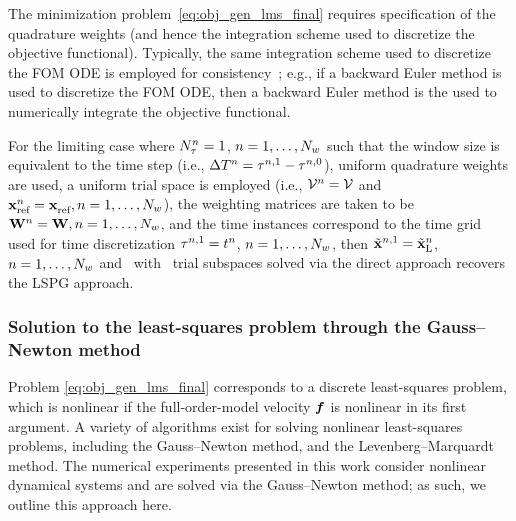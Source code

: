 The minimization problem~\eqref{eq:obj_gen_lms_final} requires specification of the quadrature weights (and hence the integration scheme used to discretize 
the objective functional). Typically, the same integration scheme used to discretize the FOM ODE is employed for consistency~\cite{colloc_review}; e.g., if a  
backward Euler method is used to discretize the FOM ODE, then a backward Euler method is the used to numerically integrate the objective functional.

\begin{remark}
For the limiting case where $N_{\tau}^{n} = 1$, $n=1,\ldots,N_w$ such that the window size is equivalent to the time step (i.e., $\Delta T^{n} = \tau^{n,1} - \tau^{n,0}$), uniform 
quadrature weights are used, a uniform trial space is employed (i.e., $\mathcal{V }^{n} = \mathcal{V }$ and $\mathbf{x}_\text{ref}^{n} = \mathbf{x}_\text{ref}^{}, n=1,\ldots,N_w$), the weighting matrices are taken to be
$\mathbf{W}^{n} = \mathbf{W}, n=1,\ldots,N_w$, and the
	time instances correspond to the time grid used for time discretization $\tau^{n,1} = t^n$, $n=1,\ldots,N_w$, then 
$\tilde{\mathbf{x}}^{n,1}  = \tilde{\mathbf{x}}_{\text{L}}^n$, $n=1,\ldots,N_w$ and  
\methodAcronym\ with \spatialAcronym\ trial
	subspaces solved via the direct approach recovers the LSPG approach. 
\end{remark} 
\subsubsection{Solution to the least-squares problem through the Gauss--Newton
	method}
	Problem \eqref{eq:obj_gen_lms_final} corresponds to a discrete least-squares
	problem, which is nonlinear if the full-order-model velocity $\boldsymbol f$ is nonlinear in
	its first argument. 
A variety of algorithms exist for solving nonlinear least-squares problems,
	including the Gauss--Newton method, and the Levenberg--Marquardt method.
 The numerical experiments
	presented in this work consider nonlinear dynamical systems and are solved
	via the Gauss--Newton method; as such, we outline this approach here. 

